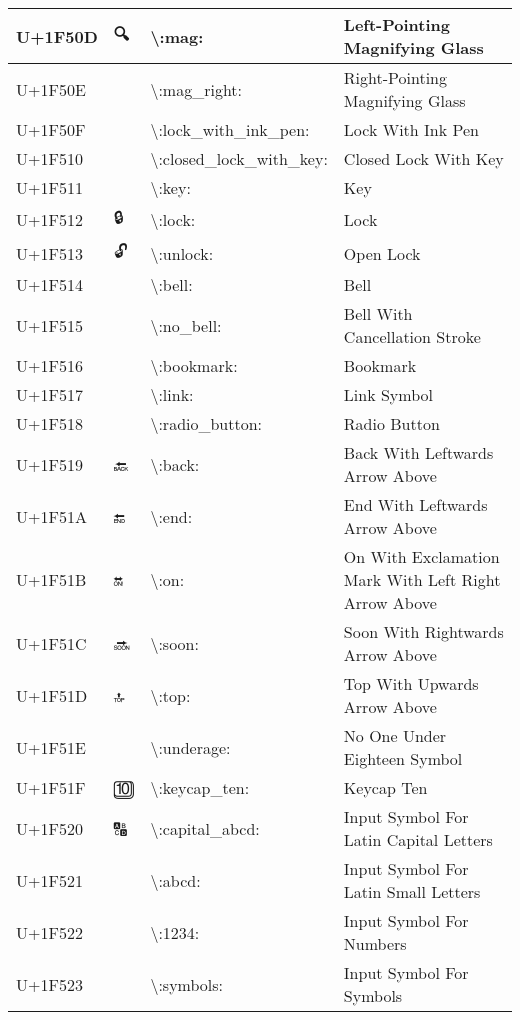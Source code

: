 \begin{table}[h]
\begin{tabulary}{\linewidth}{|L|L|L|L|}
\hline
U+1F50D & 🔍 & {\textbackslash}:mag: & Left-Pointing Magnifying Glass \\
\hline
U+1F50E & 🔎 & {\textbackslash}:mag\_right: & Right-Pointing Magnifying Glass \\
\hline
U+1F50F & 🔏 & {\textbackslash}:lock\_with\_ink\_pen: & Lock With Ink Pen \\
\hline
U+1F510 & 🔐 & {\textbackslash}:closed\_lock\_with\_key: & Closed Lock With Key \\
\hline
U+1F511 & 🔑 & {\textbackslash}:key: & Key \\
\hline
U+1F512 & 🔒 & {\textbackslash}:lock: & Lock \\
\hline
U+1F513 & 🔓 & {\textbackslash}:unlock: & Open Lock \\
\hline
U+1F514 & 🔔 & {\textbackslash}:bell: & Bell \\
\hline
U+1F515 & 🔕 & {\textbackslash}:no\_bell: & Bell With Cancellation Stroke \\
\hline
U+1F516 & 🔖 & {\textbackslash}:bookmark: & Bookmark \\
\hline
U+1F517 & 🔗 & {\textbackslash}:link: & Link Symbol \\
\hline
U+1F518 & 🔘 & {\textbackslash}:radio\_button: & Radio Button \\
\hline
U+1F519 & 🔙 & {\textbackslash}:back: & Back With Leftwards Arrow Above \\
\hline
U+1F51A & 🔚 & {\textbackslash}:end: & End With Leftwards Arrow Above \\
\hline
U+1F51B & 🔛 & {\textbackslash}:on: & On With Exclamation Mark With Left Right Arrow Above \\
\hline
U+1F51C & 🔜 & {\textbackslash}:soon: & Soon With Rightwards Arrow Above \\
\hline
U+1F51D & 🔝 & {\textbackslash}:top: & Top With Upwards Arrow Above \\
\hline
U+1F51E & 🔞 & {\textbackslash}:underage: & No One Under Eighteen Symbol \\
\hline
U+1F51F & 🔟 & {\textbackslash}:keycap\_ten: & Keycap Ten \\
\hline
U+1F520 & 🔠 & {\textbackslash}:capital\_abcd: & Input Symbol For Latin Capital Letters \\
\hline
U+1F521 & 🔡 & {\textbackslash}:abcd: & Input Symbol For Latin Small Letters \\
\hline
U+1F522 & 🔢 & {\textbackslash}:1234: & Input Symbol For Numbers \\
\hline
U+1F523 & 🔣 & {\textbackslash}:symbols: & Input Symbol For Symbols \\

\end{tabulary}
\end{table}
